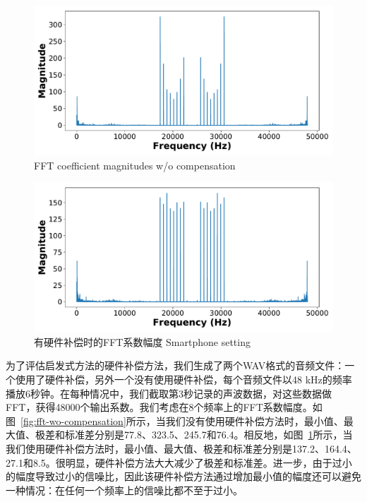 \begin{figure}
  \centering
  \begin{minipage}[t]{0.49\textwidth}
    \centering
    \includegraphics[width=\textwidth]{figure/nocompensation.pdf}
      {FFT coefficient magnitudes w/o compensation}
        \label{fig:fft-wo-compensation}
  \end{minipage}
  \centering
  \begin{minipage}[t]{0.49\textwidth}
    \centering
    \includegraphics[width=\textwidth]{figure/compensation.pdf}
    \bicaption
    {有硬件补偿时的FFT系数幅度}
    {Smartphone setting}
    \label{fig:fft-compensation}
   \end{minipage}
\end{figure}

为了评估启发式方法的硬件补偿方法，我们生成了两个WAV格式的音频文件：一个使用了硬件补偿，另外一个没有使用硬件补偿，每个音频文件以48 kHz的频率播放6秒钟。在每种情况中，我们截取第3秒记录的声波数据，对这些数据做FFT，获得48000个输出系数。我们考虑在8个频率上的FFT系数幅度。如图~\ref{fig:fft-wo-compensation}所示，当我们没有使用硬件补偿方法时，最小值、最大值、极差和标准差分别是77.8、323.5、245.7和76.4。相反地，如图~\ref{fig:fft-compensation}所示，当我们使用硬件补偿方法时，最小值、最大值、极差和标准差分别是137.2、164.4、27.1和8.5。很明显，硬件补偿方法大大减少了极差和标准差。进一步，由于过小的幅度导致过小的信噪比，因此该硬件补偿方法通过增加最小值的幅度还可以避免一种情况：在任何一个频率上的信噪比都不至于过小。


